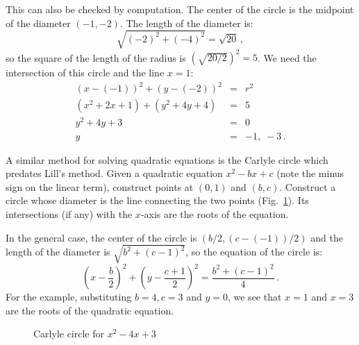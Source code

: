 This can also be checked by computation. The center of the circle is the midpoint of the diameter $(-1,-2)$. The length of the diameter is:
\[
\sqrt{(-2)^2+(-4)^2}=\sqrt{20}\,,
\]
so the square of the length of the radius is $\left(\sqrt{20/2}\right)^2=5$. We need the intersection of this circle and the line $x=1$:
\begin{eqnarray*}
(x-(-1))^2+(y-(-2))^2&=&r^2\\
(x^2+2x+1)+(y^2+4y+4)&=&5\\
y^2+4y+3&=&0\\
y&=&-1,\;-3\,.
\end{eqnarray*}


A similar method for solving quadratic equations is the Carlyle circle which predates Lill's method. Given a quadratic equation $x^2-bx+c$ (note the minus sign on the linear term), construct points at $(0,1)$ and $(b,c)$. Construct a circle whose diameter is the line connecting the two points (Fig.~\ref{f.carlyle-circle}). Its intersections (if any) with the $x$-axis are the roots of the equation.

In the general case, the center of the circle is $(b/2,(c-(-1))/2)$ and the length of the diameter is $\sqrt{b^2+(c-1)^2}$, so the equation of the circle is:
\[
\left(x-\frac{b}{2}\right)^2+\left(y-\frac{c+1}{2}\right)^2=
\frac{b^2+(c-1)^2}{4}\,.
\]
For the example, substituting $b=4,c=3$ and $y=0$, we see that  $x=1$ and $x=3$ are the roots of the quadratic equation.


\begin{figure}[t]
\begin{center}
\end{center}
\caption{Carlyle circle for $x^2-4x+3$}\label{f.carlyle-circle}
\end{figure}


